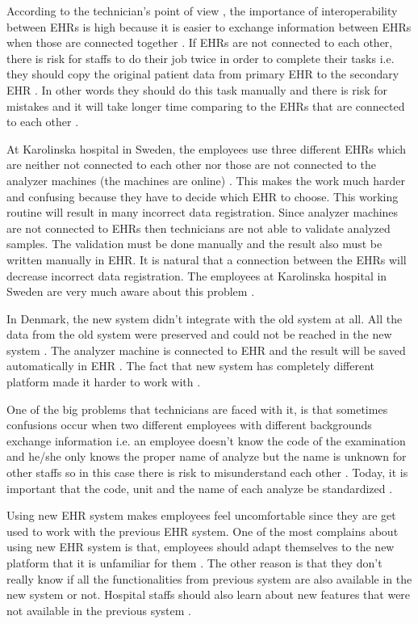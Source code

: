 \documentclass[14pt]{article}
\begin{document}
\begin{description}
According to the technician's point of view \cite{FarzinYazdi}, the importance of interoperability between \glspl{EHR} is high because it is easier to exchange information between \glspl{EHR} when those are connected together \cite{FarzinYazdi}. If \glspl{EHR} are not connected to each other, there is risk for staffs to do their job twice in order to complete their tasks i.e. they should copy the original patient data from primary \gls{EHR} to the secondary \gls{EHR} \cite{FarzinYazdi}. In other words they should do this task manually and there is risk for mistakes and it will take longer time comparing to the \glspl{EHR} that are connected to each other \cite{FarzinYazdi}.

At Karolinska hospital in Sweden, the employees use three different \glspl{EHR} which are neither not connected to each other nor those are not connected to the analyzer machines (the machines are online) \cite{FarzinYazdi}. This makes the work much harder and confusing because they have to decide which \gls{EHR} to choose. This working routine will result in many incorrect data registration. Since analyzer machines are not connected to \glspl{EHR} then technicians are not able to validate analyzed samples. The validation must be done manually and the result also must be written manually in \gls{EHR}\cite{FarzinYazdi}.  It is natural that a connection between the \glspl{EHR} will decrease incorrect data registration. The employees at Karolinska hospital in Sweden are very much aware about this problem \cite{FarzinYazdi}.

In Denmark, the new system didn't integrate with the old system at all. All the data from the old system were preserved and could not be reached in the new system \cite{FarzinYazdi}. The analyzer machine is connected to \gls{EHR} and the result will be saved automatically in \gls{EHR} \cite{FarzinYazdi}. The fact that new system has completely different platform made it harder to work with \cite{FarzinYazdi}.

One of the big problems that technicians are faced with it, is that sometimes confusions occur when two different employees with different backgrounds exchange information i.e. an employee doesn't know the code of the examination and he/she only knows the proper name of analyze but the name is unknown for other staffs so in this case there is risk to misunderstand each other \cite{FarzinYazdi}. Today, it is important that the code, unit and the name of each analyze be standardized \cite{FarzinYazdi}.

Using new \gls{EHR} system makes employees feel uncomfortable since they are get used to work with the previous \gls{EHR} system. One of the most complains about using new \gls{EHR} system is that, employees should adapt themselves to the new platform that it is unfamiliar for them \cite{FarzinYazdi}. The other reason is that they don’t really know if all the functionalities from previous system are also available in the new system or not. Hospital staffs should also learn about new features that were not available in the previous system \cite{FarzinYazdi}.

\end{description}
\end{document}
